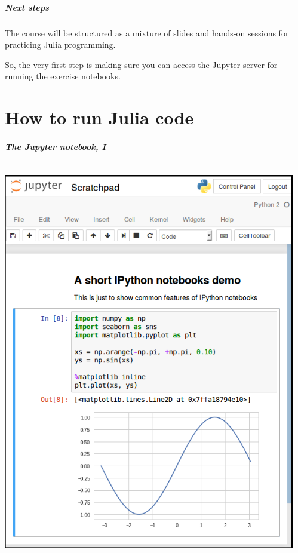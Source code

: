 \documentclass[english,serif,mathserif,xcolor=pdftex,dvipsnames,table]{beamer}
\begin{document}
\begin{frame}
  \frametitle{Next steps}

  The course will be structured as a mixture of slides and hands-on
  sessions for practicing Julia programming.

  \+
  So, the very first step is making sure you can access the Jupyter
  server for running the exercise notebooks.
\end{frame}


\part{How to run Julia code}

\begin{frame}
  \frametitle{The Jupyter notebook, I}

  \begin{columns}[t]
    \begin{column}{0.5\textwidth}
      \begin{center}
        \includegraphics[width=1.00\linewidth]{fig/nb.png}
      \end{center}
    \end{column}
    \begin{column}{0.5\textwidth}
      \small


\end{column}
\end{columns}
\end{frame}
\end{document}
